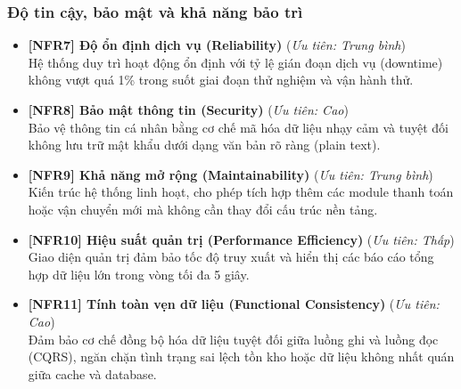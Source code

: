 \subsubsection{Độ tin cậy, bảo mật và khả năng bảo trì}

\begin{itemize}
    \item \textbf{[NFR7] Độ ổn định dịch vụ (Reliability)} \hfill (\textit{Ưu tiên: Trung bình})\\
    Hệ thống duy trì hoạt động ổn định với tỷ lệ gián đoạn dịch vụ (downtime) không vượt quá 1\% trong suốt giai đoạn thử nghiệm và vận hành thử.

    \item \textbf{[NFR8] Bảo mật thông tin (Security)} \hfill (\textit{Ưu tiên: Cao})\\
    Bảo vệ thông tin cá nhân bằng cơ chế mã hóa dữ liệu nhạy cảm và tuyệt đối không lưu trữ mật khẩu dưới dạng văn bản rõ ràng (plain text).

    \item \textbf{[NFR9] Khả năng mở rộng (Maintainability)} \hfill (\textit{Ưu tiên: Trung bình})\\
    Kiến trúc hệ thống linh hoạt, cho phép tích hợp thêm các module thanh toán hoặc vận chuyển mới mà không cần thay đổi cấu trúc nền tảng.

    \item \textbf{[NFR10] Hiệu suất quản trị (Performance Efficiency)} \hfill (\textit{Ưu tiên: Thấp})\\
    Giao diện quản trị đảm bảo tốc độ truy xuất và hiển thị các báo cáo tổng hợp dữ liệu lớn trong vòng tối đa 5 giây.

    \item \textbf{[NFR11] Tính toàn vẹn dữ liệu (Functional Consistency)} \hfill (\textit{Ưu tiên: Cao})\\
    Đảm bảo cơ chế đồng bộ hóa dữ liệu tuyệt đối giữa luồng ghi và luồng đọc (CQRS), ngăn chặn tình trạng sai lệch tồn kho hoặc dữ liệu không nhất quán giữa cache và database.
\end{itemize}